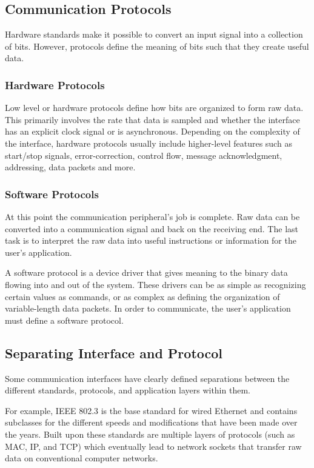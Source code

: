 \documentclass[openany,11pt,fleqn]{book} %
\begin{document}
\subsection{Communication Protocols}
Hardware standards make it possible to convert an input signal into a collection of bits. However, protocols define the meaning of bits such that they create useful data. 

\subsubsection{Hardware Protocols}
Low level or hardware protocols define how bits are organized to form raw data. This primarily involves the rate that data is sampled and whether the interface has an explicit clock signal or is asynchronous.
Depending on the complexity of the interface, hardware protocols usually include higher-level features such as start/stop signals, error-correction, control flow, message acknowledgment, addressing, data packets and more.

\subsubsection{Software Protocols}	
At this point the communication peripheral's job is complete. Raw data can be converted into a communication signal and back on the receiving end. The last task is to interpret the raw data into useful instructions or information for the user's application.

A software protocol is a device driver that gives meaning to the binary data flowing into and out of the system. These drivers can be as simple as recognizing certain values as commands, or as complex as defining the organization of variable-length data packets.  In order to communicate, the user's application must define a software protocol. 

\subsection{Separating Interface and Protocol}
   
Some communication interfaces have clearly defined separations between the different standards, protocols, and application layers within them. 

For example, IEEE 802.3 is the base standard for wired Ethernet and contains subclasses for the different speeds and modifications that have been made over the years. Built upon these standards are multiple layers of protocols (such as MAC, IP, and TCP) which eventually lead to network sockets that transfer raw data on conventional computer networks. 
\end{document}
